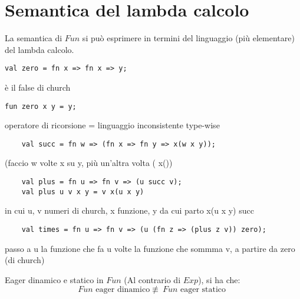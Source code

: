 \documentclass[a4paper,11pt]{report}
\begin{document}
\section{Semantica del lambda calcolo}
La semantica di \( Fun \) si può esprimere in termini del linguaggio (più elementare) del lambda calcolo.


\begin{lstlisting}
val zero = fn x => fn x => y;
\end{lstlisting}
è il false di church


\begin{lstlisting}
fun zero x y = y;
\end{lstlisting}

operatore di ricorsione = linguaggio inconsistente type-wise

\begin{lstlisting}
    val succ = fn w => (fn x => fn y => x(w x y));
\end{lstlisting}
(faccio w volte x su y, più un'altra volta ( x())

\begin{lstlisting}
    val plus = fn u => fn v => (u succ v);
    val plus u v x y = v x(u x y)
\end{lstlisting}
in cui u, v numeri di church, x funzione, y da cui parto
x(u x y) succ

\begin{lstlisting}
    val times = fn u => fn v => (u (fn z => (plus z v)) zero);
\end{lstlisting}
passo a u la funzione che fa u volte la funzione che sommma v, a partire da zero (di church)

\begin{lemmabox}{Eager dinamico e statico in \( Fun \)}{}
    (Al contrario di \( Exp \)), si ha che:
    \[ Fun \text{ eager dinamico} \not\equiv \ Fun \text{ eager statico } \]
\end{lemmabox}


\begin{prooftree}
\end{prooftree}
\end{document}

